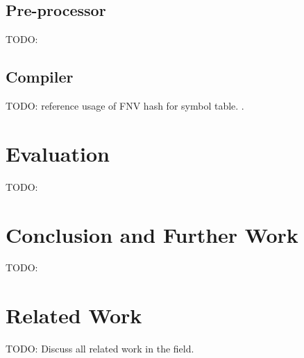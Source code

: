 \documentclass[a4paper,12pt,twoside,openright]{report}
\begin{document}
\section{Pre-processor}

TODO:

\section{Compiler}


TODO: reference usage of FNV hash for symbol table. \cite{FNVHash}.






\chapter{Evaluation}


TODO:

\chapter{Conclusion and Further Work}



TODO:

\chapter{Related Work}

TODO: Discuss all related work in the field.

\appendix
\singlespacing



\end{document}
